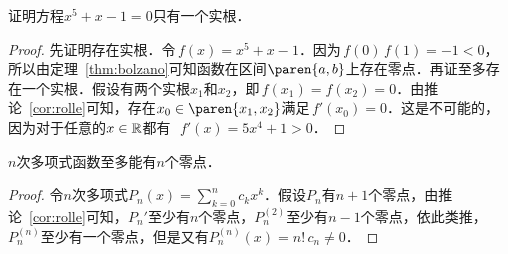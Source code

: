 \begin{example*}
  证明方程\(x^5+x-1 = 0\)只有一个实根．

  \begin{proof}
    先证明存在实根．令\(\,f(x) = x^5+x-1\)．因为\(\,f(0)\,f(1) = -1 < 0\)，所以由定理~\ref{thm:bolzano}可知函数在区间\(\paren{a,b}\)上存在零点．再证至多存在一个实根．假设有两个实根\(x_1\)和\(x_2\)，即\(\,f(x_1) = f(x_2) = 0\)．由推论~\ref{cor:rolle}可知，存在\(x_0 \in \paren{x_1, x_2}\)满足\(\,f'(x_0) = 0\)．这是不可能的，因为对于任意的\(x \in \mathbb{R}\)都有~\(\,f'(x) = 5x^4 + 1 > 0\)．
  \end{proof}
\end{example*}

\begin{theorem}
  \label{thm:polymaxnzero}
  \(n\)次多项式函数至多能有\(n\)个零点．

  \begin{proof}
    令\(n\)次多项式\(P_n(x) = \!\sum\limits_{k=0}^n c_k x^k\)．假设\(P_n\)有\(n+1\)个零点，由推论~\ref{cor:rolle}可知，\(P_n'\)至少有\(n\)个零点，\(P_n^{(2)}\)至少有\(n-1\)个零点，依此类推，\(P_n^{(n)}\)至少有一个零点，但是又有\(P_n^{(n)}(x) = n!\,c_n \ne 0\)．
  \end{proof}
\end{theorem}

